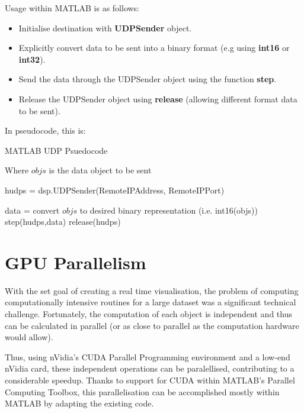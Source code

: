 \documentclass[12pt,openany,a4paper]{book}
\begin{document}
		Usage within MATLAB is as follows:
		
		\begin{itemize}
			\item Initialise destination with \textbf{UDPSender} object.
			\item Explicitly convert data to be sent into a binary format (e.g using \textbf{int16} or \textbf{int32}).
			\item Send the data through the UDPSender object using the function \textbf{step}.
			\item Release the UDPSender object using \textbf{release} (allowing different format data to be sent).
		\end{itemize}
		
		In pseudocode, this is: 
		
		\begin{algorithm}[H]
			\caption{MATLAB UDP Psuedocode}
			\label{aniM}
			Where $objs$ is the data object to be sent\newline
			\begin{algorithmic}
				
				
				\State hudps = dsp.UDPSender(RemoteIPAddress, RemoteIPPort)
				
				\State data = convert $objs$ to desired binary representation (i.e. int16(objs))
				\State step(hudps,data)
				\State release(hudps)

			\end{algorithmic}
			
		\end{algorithm}
		
		
		\section{GPU Parallelism}
		With the set goal of creating a real time visualisation, the problem of computing computationally intensive routines for a large dataset was a significant technical challenge. Fortunately, the computation of each object is independent and thus can be calculated in parallel (or as close to parallel as the computation hardware would allow). \newline
		
		Thus, using nVidia's CUDA Parallel Programming environment and a low-end nVidia card, these independent operations can be paralellised, contributing to a considerable speedup. Thanks to support for CUDA within MATLAB's Parallel Computing Toolbox, this parallelisation can be accomplished mostly within MATLAB by adapting the existing code. \newline
		
\end{document}
